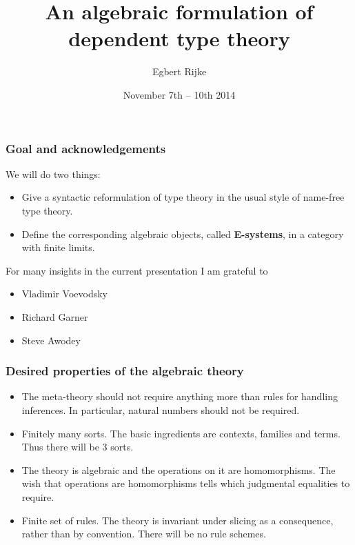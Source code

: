 \documentclass{beamer}
\title{\bf An algebraic formulation of dependent type theory}
\author{Egbert Rijke}
\institute{Carnegie Mellon University\\\texttt{erijke@andrew.cmu.edu}}
\date{November 7th -- 10th 2014}
\newcommand\important[1]{\textbf{\color{red!90!black}#1}}
\begin{document}
\begin{frame}
\titlepage
\end{frame}

\begin{frame}
\frametitle{\bf Goal and acknowledgements}
We will do two things:
\begin{itemize}
\item Give a syntactic reformulation of type theory in the usual style of
name-free type theory.
\item Define the corresponding algebraic objects, called \important{E-systems}, in a category with finite limits.
\end{itemize}
\pause
For many insights in the current presentation I am grateful to
\begin{itemize}
\item Vladimir Voevodsky
\item Richard Garner
\item Steve Awodey
\end{itemize}
\end{frame}

\begin{frame}
\frametitle{\bf Desired properties of the algebraic theory}
\begin{itemize}
\item The meta-theory should not require anything more than rules for handling
inferences. In particular, natural numbers should not be required.
\pause
\item Finitely many sorts. The basic ingredients are contexts, families and
terms. Thus there will be 3 sorts.
\pause
\item The theory is algebraic and the operations on it are homomorphisms. The
wish that operations are homomorphisms tells which judgmental equalities to
require.
\pause
\item Finite set of rules. The theory is invariant under slicing as a consequence, rather than by
convention. There will be no rule schemes.
\end{itemize}
\end{frame}
\end{document}
